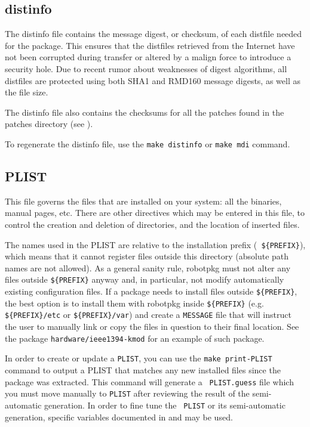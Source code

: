 \subsection{distinfo} %
\label{subsection:distinfo}

The distinfo file contains the message digest, or checksum, of each distfile
needed for the package. This ensures that the distfiles retrieved from the
Internet have not been corrupted during transfer or altered by a malign force
to introduce a security hole. Due to recent rumor about weaknesses of digest
algorithms, all distfiles are protected using both SHA1 and RMD160 message
digests, as well as the file size.

The distinfo file also contains the checksums for all the patches found in the
patches directory (see
).

To regenerate the distinfo file, use the {\tt make distinfo} or {\tt make mdi}
command.


\subsection{PLIST}
\label{subsection:PLIST}

This  file  governs the  files  that  are installed  on  your  system: all  the
binaries, manual pages, etc. There are other directives which may be entered in
this  file,  to control  the  creation and  deletion  of  directories, and  the
location of inserted files.

The  names used  in the  PLIST are  relative to  the installation  prefix ({\tt
\$\{PREFIX\}}),  which  means  that  it  cannot  register  files  outside  this
directory  (absolute path names  are not  allowed). As  a general  sanity rule,
robotpkg must  not alter  any files outside  {\tt \$\{PREFIX\}} anyway  and, in
particular, not modify automatically existing configuration files. If a package
needs  to install  files  outside {\tt  \$\{PREFIX\}},  the best  option is  to
install   them   with   robotpkg   inside  {\tt   \$\{PREFIX\}}   (e.g.    {\tt
\$\{PREFIX\}/etc} or  {\tt \$\{PREFIX\}/var}) and  create a {\tt  MESSAGE} file
that will instruct the  user to manually link or copy the  files in question to
their final location. See the package {\tt hardware/ieee1394-kmod} for an
example of such package.

In  order to  create  or  update a  {\tt  PLIST}, you  can  use  the {\tt  make
print-PLIST} command  to output  a PLIST that  matches any new  installed files
since  the  package   was  extracted.   This  command  will   generate  a  {\tt
PLIST.guess} file which  you must move manually to  {\tt PLIST} after reviewing
the result  of the semi-automatic  generation. In order  to fine tune  the {\tt
PLIST}  or  its semi-automatic  generation,  specific  variables documented  in
 and
may be used.


